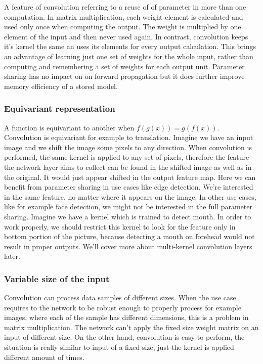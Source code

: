 A feature of convolution referring to a reuse of of parameter in more than one computation. In matrix multiplication, each weight element is calculated and used only once when computing the output. The weight is multiplied by one element of the input and then never used again. In contrast, convolution keeps it's kernel the same an uses its elements for every output calculation. This brings an advantage of learning just one set of weights for the whole input, rather than computing and remembering a set of weights for each output unit. Parameter sharing has no impact on on forward propagation but it does further improve memory efficiency of a stored model.

\subsubsection{Equivariant representation}

A function is equivariant to another when $f(g(x)) = g(f(x))$. Convolution is equivariant for example to translation. Imagine we have an input image and we shift the image some pixels to any direction. When convolution is performed, the same kernel is applied to any set of pixels, therefore the feature the network layer aims to collect can be found in the shifted image as well as in the original. It would just appear shifted in the output feature map. Here we can benefit from parameter sharing in use cases like edge detection. We're interested in the same feature, no matter where it appears on the image. In other use cases, like for example face detection, we might not be interested in the full parameter sharing. Imagine we have a kernel which is trained to detect mouth. In order to work properly, we should restrict this kernel to look for the feature only in bottom portion of the picture, because detecting a mouth on forehead would not result in proper outputs. We'll cover more about multi-kernel convolution layers later.

\subsubsection{Variable size of the input}

Convolution can process data samples of different sizes. When the use case requires to the network to be robust enough to properly process for example images, where each of the sample has different dimensions, this is a problem in matrix multiplication. The network can't apply the fixed size weight matrix on an input of different size. On the other hand, convolution is easy to perform, the situation is really similar to input of a fixed size, just the kernel is applied different amount of times.

